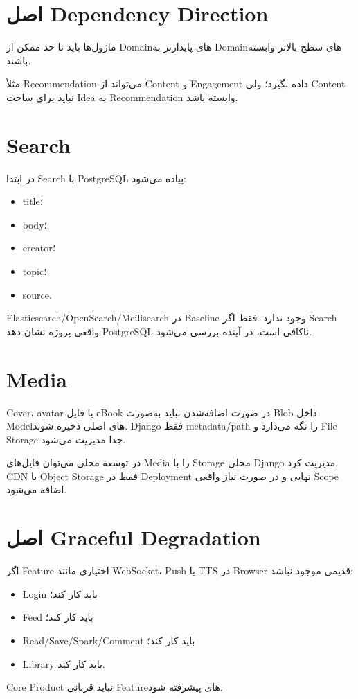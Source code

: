 \section{اصل Dependency Direction}

ماژول‌ها باید تا حد ممکن از Domainهای پایدارتر به Domainهای سطح بالاتر وابسته باشند.

مثلاً Recommendation می‌تواند از Content و Engagement داده بگیرد؛ ولی Content نباید برای ساخت Idea به Recommendation وابسته باشد.

\section{Search}

در ابتدا Search با PostgreSQL پیاده می‌شود:
\begin{itemize}
  \item title؛
  \item body؛
  \item creator؛
  \item topic؛
  \item source.
\end{itemize}

\begin{decisionbox}
Elasticsearch/OpenSearch/Meilisearch در Baseline وجود ندارد. فقط اگر Search واقعی پروژه نشان دهد PostgreSQL ناکافی است، در آینده بررسی می‌شود.
\end{decisionbox}

\section{Media}

Cover، avatar یا فایل eBook در صورت اضافه‌شدن نباید به‌صورت Blob داخل Modelهای اصلی ذخیره شوند. Django فقط metadata/path را نگه می‌دارد و File Storage جدا مدیریت می‌شود.

در توسعه محلی می‌توان فایل‌های Media را با Storage محلی Django مدیریت کرد. CDN یا Object Storage فقط در Deployment نهایی و در صورت نیاز واقعی Scope اضافه می‌شود.

\section{اصل Graceful Degradation}

اگر Feature اختیاری مانند WebSocket، Push یا TTS در Browser قدیمی موجود نباشد:
\begin{itemize}
  \item Login باید کار کند؛
  \item Feed باید کار کند؛
  \item Read/Save/Spark/Comment باید کار کند؛
  \item Library باید کار کند.
\end{itemize}

Core Product نباید قربانی Featureهای پیشرفته شود.
